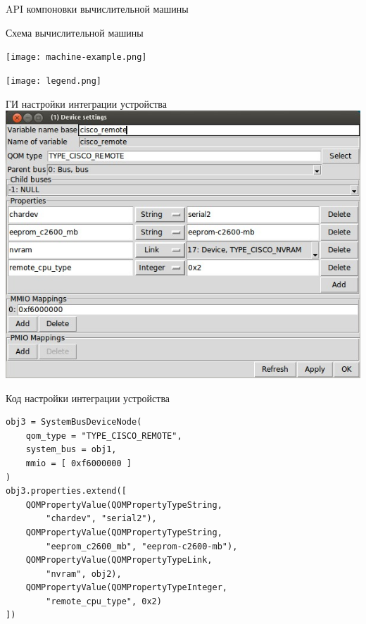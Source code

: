 \documentclass[unicode,hyperref={unicode=true}]{beamer}
\theoremstyle{definition}
\theoremstyle{plain}
\begin{document}
\begin{frame}[fragile]{API компоновки вычислительной машины}

\end{frame}



\begin{frame}{Схема вычислительной машины}
\begin{minipage}[b]{0.71\textwidth}
\texttt{[image: machine-example.png]}
\vfill
\end{minipage}
\hfill
\begin{minipage}[t]{0.24\textwidth}
\vfill
\texttt{[image: legend.png]}
\end{minipage}
\end{frame}



\begin{frame}{ГИ настройки интеграции устройства}
\includegraphics[height=0.9\textheight]{REMOTE.jpg}
\end{frame}



\begin{frame}[fragile]{Код настройки интеграции устройства}

\lstset{language=Python}
\begin{lstlisting}
obj3 = SystemBusDeviceNode(
    qom_type = "TYPE_CISCO_REMOTE",
    system_bus = obj1,
    mmio = [ 0xf6000000 ]
)
obj3.properties.extend([
    QOMPropertyValue(QOMPropertyTypeString,
        "chardev", "serial2"),
    QOMPropertyValue(QOMPropertyTypeString,
        "eeprom_c2600_mb", "eeprom-c2600-mb"),
    QOMPropertyValue(QOMPropertyTypeLink,
        "nvram", obj2),
    QOMPropertyValue(QOMPropertyTypeInteger,
        "remote_cpu_type", 0x2)
])
\end{lstlisting}

\end{frame}
\end{document}
